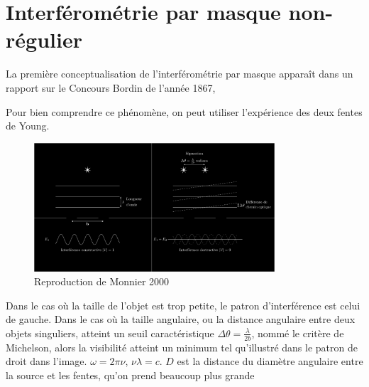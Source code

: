 \section{Interférométrie par masque non-régulier}

La première conceptualisation de l'interférométrie par masque apparaît dans un rapport sur le Concours Bordin de l'année 1867, 



Pour bien comprendre ce phénomène, on peut utiliser l'expérience des deux fentes de Young. 
\begin{figure}[H]
        \centering
        \includegraphics[width=0.8\textwidth]{figures/young_cartoon}
        \caption{Reproduction de Monnier 2000}
        \label{fig:young}
\end{figure}

Dans le cas où la taille de l'objet est trop petite, le patron d'interférence est celui de gauche. Dans le cas où 
la taille angulaire, ou la distance angulaire entre deux objets singuliers, atteint un seuil caractéristique 
$\Delta \theta = \frac{\lambda}{2b}$, nommé le critère de Michelson, alors la visibilité atteint un minimum tel qu'illustré 
dans le patron de droit dans l'image.
$\omega = 2 \pi \nu$, $\nu \lambda = c$.
$D$ est la distance du diamètre angulaire entre la source et les fentes, qu'on prend beaucoup plus grande

